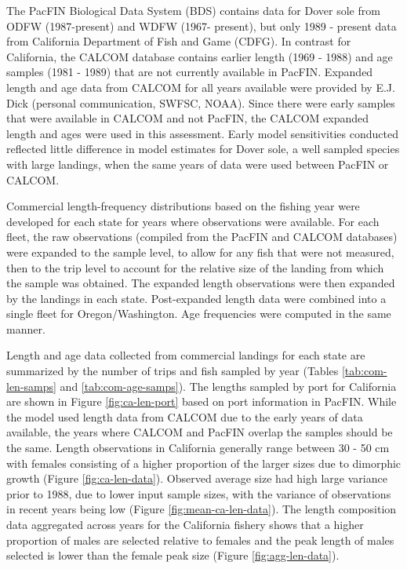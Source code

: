 \documentclass[11pt,
  english,
  a4paper,
]{article}
\begin{document}
\leavevmode\tagmcend\tagstructend


The PacFIN Biological Data System (BDS) contains data for Dover sole from ODFW (1987-present) and WDFW (1967- present), but only 1989 - present data from California Department of Fish and Game (CDFG). In contrast for California, the CALCOM database contains earlier length (1969 - 1988) and age samples (1981 - 1989) that are not currently available in PacFIN. Expanded length and age data from CALCOM for all years available were provided by E.J. Dick (personal communication, SWFSC, NOAA). Since there were early samples that were available in CALCOM and not PacFIN, the CALCOM expanded length and ages were used in this assessment. Early model sensitivities conducted reflected little difference in model estimates for Dover sole, a well sampled species with large landings, when the same years of data were used between PacFIN or CALCOM.

\leavevmode\tagmcend\tagstructend\par


Commercial length-frequency distributions based on the fishing year were developed for each state for years where observations were available. For each fleet, the raw observations (compiled from the PacFIN and CALCOM databases) were expanded to the sample level, to allow for any fish that were not measured, then to the trip level to account for the relative size of the landing from which the sample was obtained. The expanded length observations were then expanded by the landings in each state. Post-expanded length data were combined into a single fleet for Oregon/Washington. Age frequencies were computed in the same manner.

\leavevmode\tagmcend\tagstructend\par


Length and age data collected from commercial landings for each state are summarized by the number of trips and fish sampled by year (Tables \ref{tab:com-len-samps} and \ref{tab:com-age-samps}). The lengths sampled by port for California are shown in Figure \ref{fig:ca-len-port} based on port information in PacFIN. While the model used length data from CALCOM due to the early years of data available, the years where CALCOM and PacFIN overlap the samples should be the same. Length observations in California generally range between 30 - 50 cm with females consisting of a higher proportion of the larger sizes due to dimorphic growth (Figure \ref{fig:ca-len-data}). Observed average size had high large variance prior to 1988, due to lower input sample sizes, with the variance of observations in recent years being low (Figure \ref{fig:mean-ca-len-data}). The length composition data aggregated across years for the California fishery shows that a higher proportion of males are selected relative to females and the peak length of males selected is lower than the female peak size (Figure \ref{fig:agg-len-data}).
\end{document}
